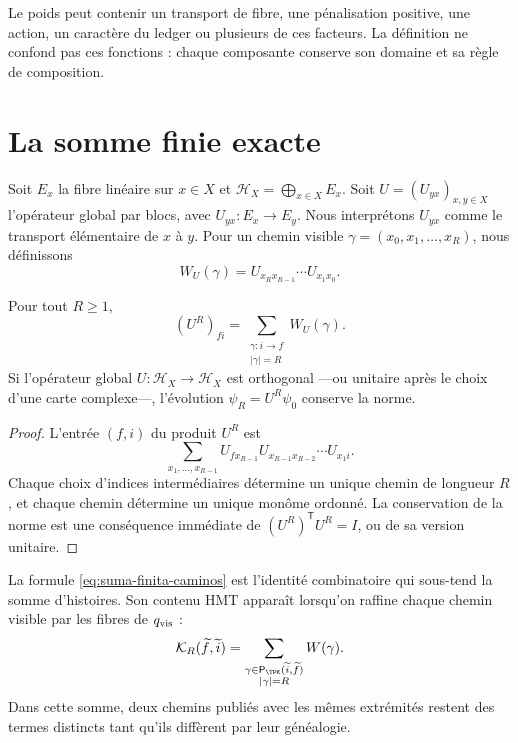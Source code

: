 Le poids peut contenir un transport de fibre, une pénalisation positive, une
action, un caractère du ledger ou plusieurs de ces facteurs. La définition ne
confond pas ces fonctions : chaque composante conserve son domaine et sa règle de
composition.

\section{La somme finie exacte}

Soit \(E_x\) la fibre linéaire sur \(x\in X\) et
\(\mathcal H_X=\bigoplus_{x\in X}E_x\). Soit
\(U=(U_{yx})_{x,y\in X}\) l'opérateur global par blocs, avec
\(U_{yx}:E_x\to E_y\). Nous interprétons \(U_{yx}\) comme le transport élémentaire
de \(x\) à \(y\). Pour un chemin visible
\(\gamma=(x_0,x_1,\ldots,x_R)\), nous définissons
\[
 W_U(\gamma)=U_{x_Rx_{R-1}}\cdots U_{x_1x_0}.
\]

\begin{theorem}
\label{thm:suma-finita-caminos}
Pour tout \(R\geq 1\),
\begin{equation}
 (U^R)_{fi}
 =\sum_{\substack{\gamma:i\to f\\|\gamma|=R}}W_U(\gamma).
 \label{eq:suma-finita-caminos}
\end{equation}
Si l'opérateur global \(U:\mathcal H_X\to\mathcal H_X\) est orthogonal ---ou
unitaire après le choix d'une carte complexe---, l'évolution
\(\psi_R=U^R\psi_0\) conserve la norme.
\end{theorem}

\begin{proof}
L'entrée \((f,i)\) du produit \(U^R\) est
\[
 \sum_{x_1,\ldots,x_{R-1}}
 U_{fx_{R-1}}U_{x_{R-1}x_{R-2}}\cdots U_{x_1i}.
\]
Chaque choix d'indices intermédiaires détermine un unique chemin de longueur
\(R\), et chaque chemin détermine un unique monôme ordonné. La conservation de la
norme est une conséquence immédiate de \((U^R)^{\mathsf T}U^R=I\), ou de sa version
unitaire.
\end{proof}

La formule \eqref{eq:suma-finita-caminos} est l'identité combinatoire qui
sous-tend la somme d'histoires. Son contenu HMT apparaît lorsqu'on raffine chaque
chemin visible par les fibres de \(q_{\rm vis}\) :
\begin{equation}
 \mathcal K_R(\widetilde f,\widetilde i)
 =\sum_{\substack{\gamma\in
        \mathsf P_{\TPK}(\widetilde i,\widetilde f)\\|\gamma|=R}}
 W(\gamma).
 \label{eq:kernel-genealogico-finito}
\end{equation}
Dans cette somme, deux chemins publiés avec les mêmes extrémités restent des termes
distincts tant qu'ils diffèrent par leur généalogie.

